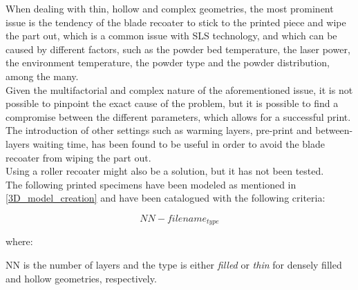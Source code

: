 \documentclass{article}
\begin{document}
        When dealing with thin, hollow and complex geometries, the most prominent issue is the tendency of the 
        blade recoater to stick to the printed piece and wipe the part out, which is a common 
        issue with SLS technology, and which 
        can be caused by different factors, such as the powder bed temperature, the laser power, the 
        environment temperature, the powder type and the powder distribution, among the many. \\ 

        Given the multifactorial and complex nature of the aforementioned issue, it is not possible to 
        pinpoint the exact cause of the problem, but it is possible to find a compromise between the 
        different parameters, which allows for a successful print. \\
        
        The introduction of other settings such as warming layers, pre-print 
        and between-layers waiting time, has been found to be useful in order to avoid 
        the blade recoater from wiping the part out. \\

        Using a roller recoater might also be a solution, but it has not been tested. \\ 

        The following printed specimens have been modeled as mentioned in \ref{3D_model_creation} and 
        have been catalogued with the following criteria: 

        \begin{equation}
            NN-filename_{type}
            \label{eq:SLS_specimen_notation}
        \end{equation}

        where: 

        NN is the number of layers and the type is either \textit{filled} or \textit{thin} for densely filled and hollow geometries, respectively. \\ 
\end{document}

